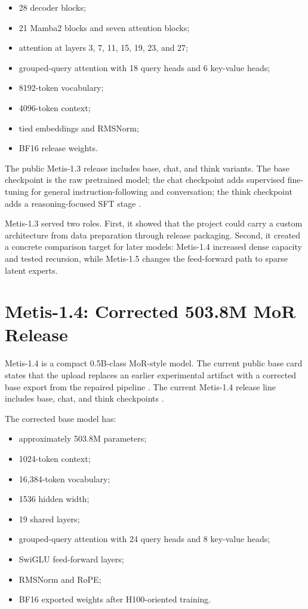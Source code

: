 \documentclass[11pt]{article}
\begin{document}
\begin{itemize}
  \item 28 decoder blocks;
  \item 21 Mamba2 blocks and seven attention blocks;
  \item attention at layers 3, 7, 11, 15, 19, 23, and 27;
  \item grouped-query attention with 18 query heads and 6 key-value heads;
  \item 8192-token vocabulary;
  \item 4096-token context;
  \item tied embeddings and RMSNorm;
  \item BF16 release weights.
\end{itemize}

The public Metis-1.3 release includes base, chat, and think variants. The base
checkpoint is the raw pretrained model; the chat checkpoint adds supervised
fine-tuning for general instruction-following and conversation; the think
checkpoint adds a reasoning-focused SFT stage \cite{metis13base,metis13chat,metis13think}.

Metis-1.3 served two roles. First, it showed that the project could carry a
custom architecture from data preparation through release packaging. Second, it
created a concrete comparison target for later models: Metis-1.4 increased dense
capacity and tested recursion, while Metis-1.5 changes the feed-forward path to
sparse latent experts.

\section{Metis-1.4: Corrected 503.8M MoR Release}

Metis-1.4 is a compact 0.5B-class MoR-style model. The current public base card
states that the upload replaces an earlier experimental artifact with a
corrected base export from the repaired pipeline \cite{metis14base}. The current
Metis-1.4 release line includes base, chat, and think checkpoints
\cite{metis14base,metis14chat,metis14think}.

The corrected base model has:

\begin{itemize}
  \item approximately 503.8M parameters;
  \item 1024-token context;
  \item 16,384-token vocabulary;
  \item 1536 hidden width;
  \item 19 shared layers;
  \item grouped-query attention with 24 query heads and 8 key-value heads;
  \item SwiGLU feed-forward layers;
  \item RMSNorm and RoPE;
  \item BF16 exported weights after H100-oriented training.
\end{itemize}
\end{document}
